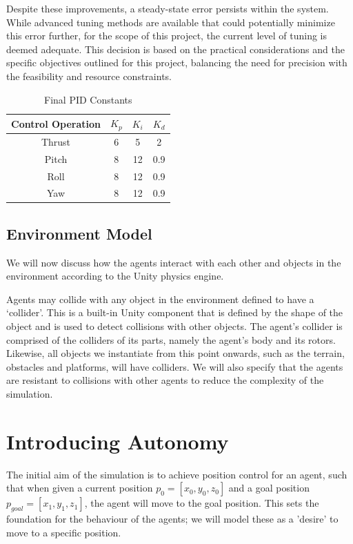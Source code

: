 \documentclass[12pt]{article}
\begin{document}
Despite these improvements, a steady-state error persists within the system. While advanced tuning methods are available that could potentially minimize this error further, for the scope of this project, the current level of tuning is deemed adequate. This decision is based on the practical considerations and the specific objectives outlined for this project, balancing the need for precision with the feasibility and resource constraints.

\begin{table}[ht]
    \centering
        \begin{tabular}{| c | c | c | c |} 
        \hline
        Control Operation & $K_p$ & $K_i$ & $K_d$ \\ 
        \hline
        Thrust & 6 & 5 & 2 \\
        \hline
        Pitch & 8 & 12 & 0.9 \\
        \hline
        Roll & 8 & 12 & 0.9 \\
        \hline
        Yaw & 8 & 12 & 0.9 \\
        \hline
        \end{tabular}
        \caption{Final PID Constants}
        \label{tab:pid-final}
\end{table}

\subsection{Environment Model}
We will now discuss how the agents interact with each other and objects in the environment according to the Unity physics engine.

Agents may collide with any object in the environment defined to have a `collider'. This is a built-in Unity component that is defined by the shape of the object and is used to detect collisions with other objects.  The agent's collider is comprised of the colliders of its parts, namely the agent's body and its rotors. Likewise, all objects we instantiate from this point onwards, such as the terrain, obstacles and platforms, will have colliders. We will also specify that the agents are resistant to collisions with other agents to reduce the complexity of the simulation.

\newpage
\section{Introducing Autonomy}
The initial aim of the simulation is to achieve position control for an agent, such that when given a current position $p_0 = [x_0,y_0,z_0]$ and a goal position $p_{goal} = [x_1,y_1,z_1]$, the agent will move to the goal position. This sets the foundation for the behaviour of the agents; we will model these as a 'desire' to move to a specific position.
\end{document}
